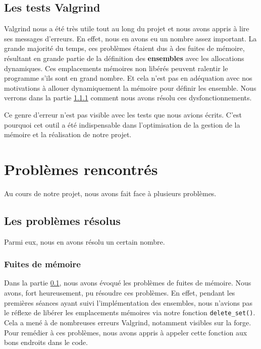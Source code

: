 \documentclass[a4paper]{article}
\begin{document}
\subsection{Les tests Valgrind}
\label{valgrind tests}

Valgrind nous a été très utile tout au long du projet et nous avons appris à lire ses messages d'erreurs. En effet, nous en avons eu un nombre assez important. La grande majorité du temps, ces problèmes étaient dus à des fuites  de mémoire, résultant en grande partie de la définition des \textbf{ensembles} avec les allocations dynamiques. Ces emplacements mémoires non libérés peuvent ralentir le programme s'ils sont en grand nombre. Et cela n'est pas en adéquation avec nos motivations à allouer dynamiquement la mémoire pour définir les ensemble. Nous verrons dans la partie \ref{fuite mem} comment nous avons résolu ces dysfonctionnements.

Ce genre d'erreur n'est pas visible avec les tests que nous avions écrits. C'est pourquoi cet outil a été indispensable dans l'optimisation de la gestion de la mémoire et la réalisation de notre projet.


\section{Problèmes rencontrés}
\label{pb}
Au cours de notre projet, nous avons fait face à plusieurs problèmes.

\subsection{Les problèmes résolus}
\label{pb resolus}

Parmi eux, nous en avons résolu un certain nombre.

\subsubsection{Fuites de mémoire}
\label{fuite mem}

Dans la partie \ref{valgrind tests}, nous avons évoqué les problèmes de fuites de mémoire. Nous avons, fort heureusement, pu résoudre ces problèmes. En effet, pendant les premières séances ayant suivi l'implémentation des ensembles, nous n'avions pas le réflexe de libérer les emplacements mémoires via notre fonction \verb|delete_set()|. Cela a mené à de nombreuses erreurs Valgrind, notamment visibles sur la forge. Pour remédier à ces problèmes, nous avons appris à appeler cette fonction aux bons endroits dans le code. 
\end{document}
